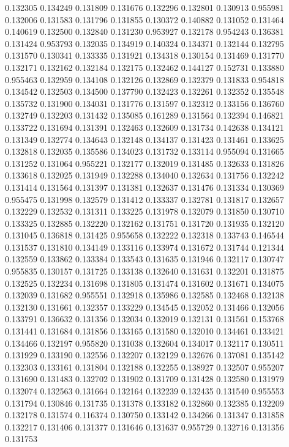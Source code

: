 0.132305
0.134249
0.131809
0.131676
0.132296
0.132801
0.130913
0.955981
0.132006
0.131583
0.131796
0.131855
0.130372
0.140882
0.131052
0.131464
0.140619
0.132500
0.132840
0.131230
0.953927
0.132178
0.954243
0.136381
0.131424
0.953793
0.132035
0.134919
0.140324
0.134371
0.132144
0.132795
0.131570
0.130341
0.133335
0.131921
0.134318
0.130154
0.131469
0.131770
0.132171
0.132162
0.132184
0.132175
0.132462
0.144127
0.152731
0.133880
0.955463
0.132959
0.134108
0.132126
0.132869
0.132379
0.131833
0.954818
0.134542
0.132503
0.134500
0.137790
0.132423
0.132261
0.132352
0.135548
0.135732
0.131900
0.134031
0.131776
0.131597
0.132312
0.133156
0.136760
0.132749
0.132203
0.131432
0.135085
0.161289
0.131564
0.132394
0.146821
0.133722
0.131694
0.131391
0.132463
0.132609
0.131734
0.142638
0.134121
0.131349
0.132774
0.134643
0.132148
0.134137
0.131423
0.131461
0.133625
0.132818
0.132035
0.135586
0.134023
0.131732
0.133114
0.955094
0.131665
0.131252
0.131064
0.955221
0.132177
0.132019
0.131485
0.132633
0.131826
0.133618
0.132025
0.131949
0.132288
0.134040
0.132634
0.131756
0.132242
0.131414
0.131564
0.131397
0.131381
0.132637
0.131476
0.131334
0.130369
0.955475
0.131998
0.132579
0.131412
0.133337
0.132781
0.131817
0.132657
0.132229
0.132532
0.131311
0.133225
0.131978
0.132079
0.131850
0.130710
0.133325
0.132885
0.132220
0.132162
0.131751
0.131720
0.131935
0.132120
0.131045
0.136818
0.131425
0.955658
0.132222
0.132318
0.133743
0.146544
0.131537
0.131810
0.134149
0.133116
0.133974
0.131672
0.131744
0.121344
0.132559
0.133862
0.133384
0.133543
0.131635
0.131946
0.132117
0.130747
0.955835
0.130157
0.131725
0.133138
0.132640
0.131631
0.132201
0.131875
0.132525
0.132234
0.131698
0.131805
0.131474
0.131602
0.131671
0.134075
0.132039
0.131682
0.955551
0.132918
0.135986
0.132585
0.132468
0.132138
0.132130
0.131661
0.132357
0.133229
0.134545
0.132052
0.131466
0.132056
0.133791
0.136632
0.131356
0.132034
0.132019
0.132131
0.131561
0.153768
0.131441
0.131684
0.131856
0.133165
0.131580
0.132010
0.134461
0.133421
0.134466
0.132197
0.955820
0.131038
0.132604
0.134017
0.132117
0.130511
0.131929
0.133190
0.132556
0.132207
0.132129
0.132676
0.137081
0.135142
0.132303
0.133161
0.131804
0.132188
0.132255
0.138927
0.132507
0.955207
0.131690
0.131483
0.132702
0.131902
0.131709
0.131428
0.132580
0.131979
0.132074
0.132563
0.131664
0.132164
0.132239
0.132435
0.131540
0.955553
0.131794
0.130846
0.131735
0.131378
0.133182
0.132860
0.132385
0.132209
0.132178
0.131574
0.116374
0.130750
0.133142
0.134266
0.131347
0.131858
0.132217
0.131406
0.131377
0.131646
0.131637
0.955729
0.132716
0.131356
0.131753
